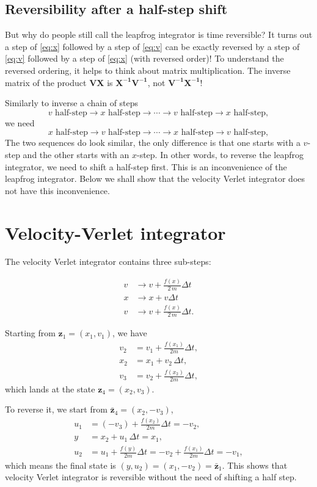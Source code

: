 \documentclass{article}
\begin{document}
\subsection{Reversibility after a half-step shift}

But why do people still call the leapfrog integrator
is time reversible?  It turns out a step of \eqref{eq:x}
followed by a step of \eqref{eq:v} can be exactly reversed
by a step of \eqref{eq:v} followed by a step of \eqref{eq:x}
(with reversed order)!
%
To understand the reversed ordering,
it helps to think about matrix multiplication.  The inverse matrix
of the product $\mathbf{V X} $ is $\mathbf{X^{-1} V^{-1}}$,
not $\mathbf{V^{-1} X^{-1}}$!

Similarly to inverse a chain of steps
$$
v\mbox{ half-step}
\rightarrow
x\mbox{ half-step}
\rightarrow \cdots \rightarrow
v\mbox{ half-step}
\rightarrow
x\mbox{ half-step},
$$
we need
$$
x\mbox{ half-step}
\rightarrow
v\mbox{ half-step}
\rightarrow \cdots \rightarrow
x\mbox{ half-step}
\rightarrow
v\mbox{ half-step},
$$
The two sequences do look similar,
the only difference is that one starts with a $v$-step
and the other starts with an $x$-step.
%
In other words,
to reverse the leapfrog integrator,
we need to shift a half-step first.
%
This is an inconvenience of the leapfrog integrator.
%
Below we shall show that the velocity Verlet integrator
does not have this inconvenience.


\section{Velocity-Verlet integrator}


The velocity Verlet integrator contains three sub-steps:

\begin{align}
v &\rightarrow v + \frac{f(x)}{2\,m} \Delta t
\tag{vv-V1}
\label{eq:vv_v1}
\\
x &\rightarrow x + v \Delta t
\tag{vv-X}
\label{eq:vv_x}
\\
v &\rightarrow v + \frac{f(x)}{2\,m} \Delta t.
\tag{vv-V2}
\label{eq:vv_v2}
\end{align}

Starting from ${\mathbf z}_1 = (x_1, v_1)$, we have
\begin{align}
v_2 &= v_1 + \frac{f(x_1)}{2m} \Delta t, \\
x_2 &= x_1 + v_2 \, \Delta t, \\
v_3 &= v_2 + \frac{f(x_2)}{2m} \Delta t,
\end{align}
which lands at the state ${\mathbf z}_4 = (x_2, v_3)$.

To reverse it, we start from $\bar{\mathbf z}_4 = (x_2, -v_3)$,
\begin{align}
u_1 &= (-v_3) + \frac{f(x_2)}{2m} \Delta t = -v_2 , \\
y &= x_2 + u_1 \, \Delta t = x_1, \\
u_2 &= u_1 + \frac{f(y)}{2m} \Delta t = -v_2 + \frac{f(x_1)}{2m} \Delta t = -v_1,
\end{align}
which means the final state is
$(y, u_2) = (x_1, -v_2) = \bar{\mathbf z}_1$.
This shows that velocity Verlet integrator is reversible without
the need of shifting a half step.
\end{document}
